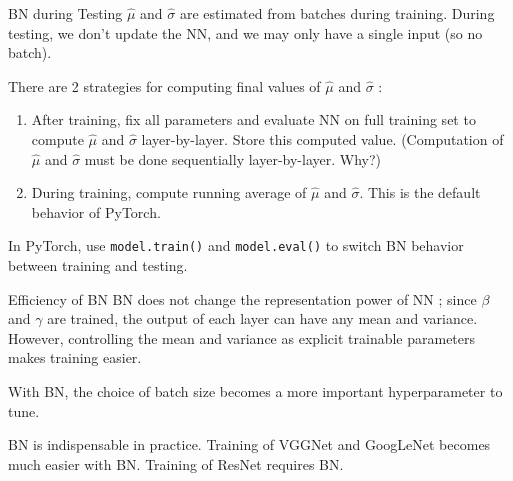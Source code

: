 \begin{frame}[allowframebreaks]

\begin{mydefinitionblock}{6.48}{BN during Testing}
    $\hat{\mu}$ and $\hat{\sigma}$ are estimated from batches during training. During testing, we don't update the NN, and we may only have a single input (so no batch).

    There are 2 strategies for computing final values of $\hat{\mu}$ and $\hat{\sigma}$ :

    \begin{enumerate}
        \item After training, fix all parameters and evaluate NN on full training set to compute $\hat{\mu}$ and $\hat{\sigma}$ layer-by-layer. Store this computed value. (Computation of $\hat{\mu}$ and $\hat{\sigma}$ must be done sequentially layer-by-layer. Why?)
        \item During training, compute running average of $\hat{\mu}$ and $\hat{\sigma}$. This is the default behavior of PyTorch.
    \end{enumerate}

    In PyTorch, use \verb|model.train()| and \verb|model.eval()| to switch BN behavior between training and testing.
\end{mydefinitionblock}

\end{frame}

\begin{frame}[allowframebreaks]

\begin{myconceptblock}{6.49}{Efficiency of BN}
    BN does not change the representation power of NN ; since $\beta$ and $\gamma$ are trained, the output of each layer can have any mean and variance. However, controlling the mean and variance as explicit trainable parameters makes training easier.

    With BN, the choice of batch size becomes a more important hyperparameter to tune.

    BN is indispensable in practice. Training of VGGNet and GoogLeNet becomes much easier with BN. Training of ResNet requires BN.
\end{myconceptblock}

\end{frame}

